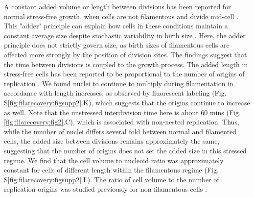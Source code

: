 A constant added volume or length between divisions has been reported for normal stress-free growth, when cells are not filamentous and divide mid-cell \cite{Amir2014a, Campos2014, Taheri-Araghi2014, Wallden2016}. This "adder" principle can explain how cells in these conditions maintain a constant average size despite stochastic variability in birth size \cite{Amir2014a, Campos2014, Taheri-Araghi2014}. Here, the adder principle does not strictly govern size, as birth sizes of filamentous cells are affected more strongly by the position of division sites. The findings suggest that the time between divisions is coupled to the growth process. The added length in stress-free cells has been reported to be proportional to the number of origins of replication \cite{Ho2015, Zheng2016}. We found nuclei to continue to multiply during filamentation in accordance with length increases, as observed by fluorescent labeling (Fig. S\ref{fig:filarecovery:figsupp2}.K), which suggests that the origins continue to increase as well. Note that the unstressed interdivision time here is about 60 mins (Fig. \ref{fig:filarecovery:fig2}.C), which is associated with non-nested replication. Thus, while the number of nuclei differs several fold between normal and filamented cells, the added size between divisions remains approximately the same, suggesting that the number of origins does not set the added size in this stressed regime. We find that the cell volume to nucleoid ratio was approximately constant for cells of different length within the filamentous regime (Fig. S\ref{fig:filarecovery:figsupp2}.L). The ratio of cell volume to the number of replication origins was studied previously for non-filamentous cells \cite{Si2017, Cooper1968}.

